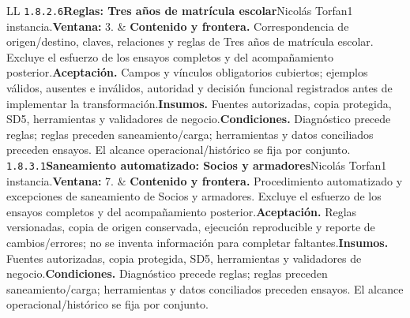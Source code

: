 \begin{longtable}{L{\tabcolsep\relax}L{\tabcolsep\relax}}
\texttt{1.\allowbreak{}8.\allowbreak{}2.\allowbreak{}6}\newline{}\textbf{Reglas: Tres años de matrícula escolar}\newline{}Nicolás Torfan\newline{}1 instancia.\newline{}\textbf{Ventana:} 3. & \textbf{Contenido y frontera.} Correspondencia de origen/destino, claves, relaciones y reglas de Tres años de matrícula escolar. Excluye el esfuerzo de los ensayos completos y del acompañamiento posterior.\newline{}\textbf{Aceptación.} Campos y vínculos obligatorios cubiertos; ejemplos válidos, ausentes e inválidos, autoridad y decisión funcional registrados antes de implementar la transformación.\newline{}\textbf{Insumos.} Fuentes autorizadas, copia protegida, SD5, herramientas y validadores de negocio.\newline{}\textbf{Condiciones.} Diagnóstico precede reglas; reglas preceden saneamiento/carga; herramientas y datos conciliados preceden ensayos. El alcance operacional/histórico se fija por conjunto.\\\hline
\texttt{1.\allowbreak{}8.\allowbreak{}3.\allowbreak{}1}\newline{}\textbf{Saneamiento automatizado: Socios y armadores}\newline{}Nicolás Torfan\newline{}1 instancia.\newline{}\textbf{Ventana:} 7. & \textbf{Contenido y frontera.} Procedimiento automatizado y excepciones de saneamiento de Socios y armadores. Excluye el esfuerzo de los ensayos completos y del acompañamiento posterior.\newline{}\textbf{Aceptación.} Reglas versionadas, copia de origen conservada, ejecución reproducible y reporte de cambios/errores; no se inventa información para completar faltantes.\newline{}\textbf{Insumos.} Fuentes autorizadas, copia protegida, SD5, herramientas y validadores de negocio.\newline{}\textbf{Condiciones.} Diagnóstico precede reglas; reglas preceden saneamiento/carga; herramientas y datos conciliados preceden ensayos. El alcance operacional/histórico se fija por conjunto.\\\hline

\end{longtable}
